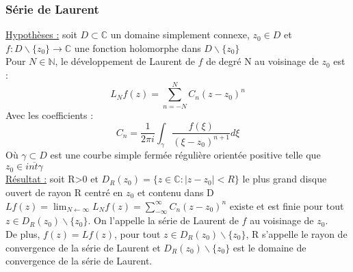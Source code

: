 \documentclass[../main.tex]{subfiles}
\begin{document}
\subsubsection{Série de Laurent}
\quad \underline{Hypothèses :} soit $D\subset \mathbb{C}$ un domaine simplement connexe, $z_0 \in D$ et $f: D\backslash \{z_0\} \rightarrow \mathbb{C}$ une fonction holomorphe dans $D\backslash \{z_0\}$\\

Pour $N \in \mathbb{N}$, le développement de Laurent de $f$ de degré N au voisinage de $z_0$ est :\\
\begin{equation}
    L_N f(z) = \sum_{n=-N}^N C_n(z-z_0)^n
\end{equation}
Avec les coefficients :\\
\begin{equation}
    C_n = \frac{1}{2\pi i }\int_\gamma \frac{f(\xi)}{(\xi-z_0)^{n+1}}d\xi
\end{equation}
Où $\gamma \subset D$ est une courbe simple fermée régulière orientée positive telle que $z_0 \in \overline{int \gamma}$\\

\quad \underline{Résultat :} soit R>0 et $D_R(z_0) = \{z\in \mathbb{C} : \lvert z-z_0\rvert < R \}$ le plus grand disque ouvert de rayon R centré en $z_0$ et contenu dans D\\

$Lf(z) = \lim_{N\leftarrow \infty} L_Nf(z) = \sum_{-\infty}^\infty C_n (z-z_0)^n$ existe et est finie pour tout $z \in D_R(z_0) \backslash \{z_0\}$. On l'appelle la série de Laurent de $f$ au voisinage de $z_0$.\\
De plus, $f(z) = Lf(z)$, pour tout $z\in D_R(z_0) \backslash \{z_0\}$, R s'appelle le rayon de convergence de la série de Laurent et $D_R(z_0) \backslash \{z_0\}$ est le domaine de convergence de la série de Laurent.\\
\end{document}
